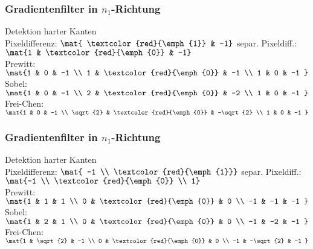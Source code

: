 \documentclass[6pt,a4paper]{scrartcl}
\begin{document}
\begin{multicols}{4}
{	\subsubsection{Gradientenfilter in $n_1$-Richtung}
	Detektion harter Kanten\\
	Pixeldifferenz: $\mat{ \textcolor{red}{\emph{1}} & -1}$ 
	separ. Pixeldiff.: $\mat{1 & \textcolor{red}{\emph{0}} & -1} $\\
	Prewitt: $\mat{1 & 0 & -1 \\ 1 & \textcolor{red}{\emph{0}} & -1 \\ 1 & 0 & -1 }$ 
	Sobel: $\mat{1 & 0 & -1 \\ 2 & \textcolor{red}{\emph{0}} & -2 \\ 1 & 0 & -1 }$ \\
	Frei-Chen: $\mat{1 & 0 & -1 \\ \sqrt{2} & \textcolor{red}{\emph{0}} & -\sqrt{2} \\ 1 & 0 & -1 }$ 

	\subsubsection{Gradientenfilter in $n_1$-Richtung}
	Detektion harter Kanten\\
	Pixeldifferenz: $\mat{ -1 \\ \textcolor{red}{\emph{1}}}$ 
	separ. Pixeldiff.: $\mat{-1 \\ \textcolor{red}{\emph{0}} \\ 1} $\\
	Prewitt: $\mat{1 & 1 & 1 \\ 0 & \textcolor{red}{\emph{0}} & 0 \\ -1 & -1 & -1 }$ 
	Sobel: $\mat{1 & 2 & 1 \\ 0 & \textcolor{red}{\emph{0}} & 0 \\ -1 & -2 & -1 }$ \\
	Frei-Chen: $\mat{1 & \sqrt{2} & -1 \\ 0 & \textcolor{red}{\emph{0}} & 0 \\ -1 & -\sqrt{2} & -1 }$ 

}

\end{multicols}
\end{document}
